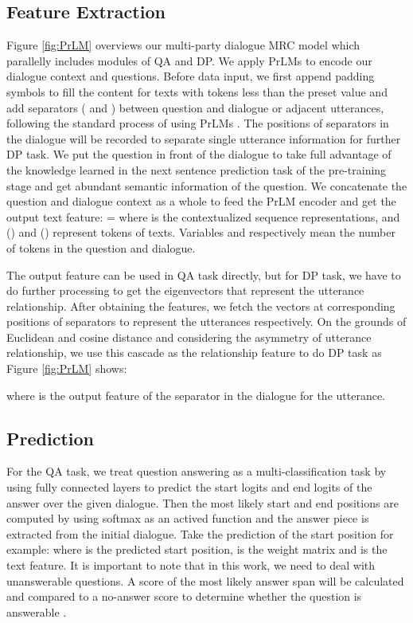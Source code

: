 \documentclass[11pt]{article}
\begin{document}
\subsection{Feature Extraction}\label{subsec:embeddings}
Figure \ref{fig:PrLM} overviews our multi-party dialogue MRC model which parallelly includes modules of QA and DP. We apply PrLMs to encode our dialogue context and questions. Before data input, we first append padding symbols to fill the content for texts with tokens less than the preset value and add separators ( and ) between question and dialogue or adjacent utterances, following the standard process of using PrLMs \cite{devlin-etal-2019-bert}. The positions of separators in the dialogue will be recorded to separate single utterance information for further DP task. We put the question in front of the dialogue to take full advantage of the knowledge learned in the next sentence prediction task of the pre-training stage and get abundant semantic information of the question. We concatenate the question  and dialogue context  as a whole to feed the PrLM encoder and get the output text feature:
=
where  is the contextualized sequence representations, and  () and  () represent tokens of texts. Variables  and  respectively mean the number of tokens in the question and dialogue. 

The output feature can be used in QA task directly, but for DP task, we have to do further processing to get the eigenvectors that represent the utterance relationship. After obtaining the features, we fetch the vectors at corresponding positions of separators to represent the utterances respectively. On the grounds of Euclidean and cosine distance and considering the asymmetry of utterance relationship, we use this cascade as the relationship feature to do DP task as Figure \ref{fig:PrLM} shows:

where  is the output feature of the  separator in the dialogue for the  utterance.
\subsection{Prediction}\label{subsec:answer pred}
For the QA task, we treat question answering as a multi-classification task by using fully connected layers to predict the start logits and end logits of the answer over the given dialogue. Then the most likely start and end positions are computed by using softmax as an actived function and the answer piece is extracted from the initial dialogue. Take the prediction of the start position for example:
 where  is the predicted start position,  is the weight matrix and  is the text feature. It is important to note that in this work, we need to deal with unanswerable questions. A score of the most likely answer span will be calculated and compared to a no-answer score to determine whether the question is answerable \cite{zhang2020retrospective}.
\end{document}
